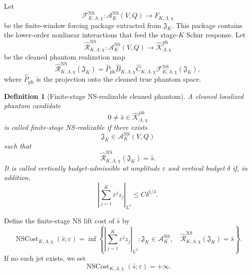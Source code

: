 \documentclass[11pt]{article}
\numberwithin{equation}{section}
\newtheorem{definition}[theorem]{Definition}
\begin{document}
Let
\[
        \mathcal F_{K,\Lambda,\chi}^{\mathrm{NS}}
        :\mathcal A_K^{\mathrm{NS}}(V,Q)
        \longrightarrow
        F_{K,\Lambda,\chi}
\]
be the finite-window forcing package extracted from \(\mathfrak J_K\).  This package contains the lower-order nonlinear interactions that feed the stage-\(K\) Schur response.  Let
\[
        \widehat{\mathcal R}_{K,\Lambda,\chi}^{\mathrm{NS}}
        :\mathcal A_K^{\mathrm{NS}}(V,Q)
        \longrightarrow
        \widehat{\mathcal K}_{\Lambda,\chi}^{\mathrm{ph}}
\]
be the cleaned phantom realization map
\begin{equation}\label{eq:cleaned-phantom-realization-map}
        \widehat{\mathcal R}_{K,\Lambda,\chi}^{\mathrm{NS}}(\mathfrak J_K)
        =
        \widehat P_{\mathrm{ph}}
        \widehat B_{K,\Lambda,\chi}
        \widehat C_{K,\Lambda,\chi}
        \mathcal F_{K,\Lambda,\chi}^{\mathrm{NS}}(\mathfrak J_K),
\end{equation}
where \(\widehat P_{\mathrm{ph}}\) is the projection onto the cleaned true phantom space.

\begin{definition}[Finite-stage NS-realizable cleaned phantom]\label{def:finite-stage-NS-realizable-cleaned-phantom}
A cleaned localized phantom candidate
\[
        0\neq\widehat s\in
        \widehat{\mathcal K}_{\Lambda,\chi}^{\mathrm{ph}}
\]
is called finite-stage NS-realizable if there exists
\[
        \mathfrak J_K\in\mathcal A_K^{\mathrm{NS}}(V,Q)
\]
such that
\[
        \widehat{\mathcal R}_{K,\Lambda,\chi}^{\mathrm{NS}}(\mathfrak J_K)
        =\widehat s.
\]
It is called vertically budget-admissible at amplitude \(\varepsilon\) and vertical budget \(\delta\) if, in addition,
\[
        \left|
        \sum_{j=1}^K\varepsilon^j z_j
        \right|_{L^3}
        \le
        C\delta^{1/3}.
\]
\end{definition}

Define the finite-stage NS lift cost of \(\widehat s\) by
\[
        \operatorname{NSCost}_{K,\Lambda,\chi}(\widehat s;\varepsilon)
        =
        \inf
        \left\{
        \left|
        \sum_{j=1}^K\varepsilon^j z_j
        \right|_{L^3}
        :
        \mathfrak J_K\in\mathcal A_K^{\mathrm{NS}},
        \quad
        \widehat{\mathcal R}_{K,\Lambda,\chi}^{\mathrm{NS}}(\mathfrak J_K)=\widehat s
        \right\}.
\]
If no such jet exists, we set
\[
        \operatorname{NSCost}_{K,\Lambda,\chi}(\widehat s;\varepsilon)=+\infty.
\]
\end{document}
